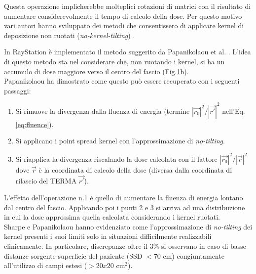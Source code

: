 {\begin{figure}
\label{fig:kern_tilt}
\end{figure}
Questa operazione implicherebbe molteplici rotazioni di matrici \cite{Sharpe1997} con il risultato di aumentare considerevolmente il tempo di calcolo della dose. 
Per questo motivo vari autori hanno sviluppato dei metodi che consentissero di applicare kernel di deposizione non ruotati (\textit{no-kernel-tilting}) \cite{Sharpe1997,Papanikolaou1993}.

In RayStation è implementato il metodo suggerito da Papanikolaou et al. \cite{Papanikolaou1993}. L'idea di questo metodo sta nel considerare che, non ruotando i kernel, si ha un accumulo di dose maggiore verso il centro del fascio (Fig.\ref{fig:kern_tilt}b).\\ 
Papanikolaou ha dimostrato come questo può essere recuperato con i seguenti passaggi:
\begin{enumerate}
\item Si rimuove la divergenza dalla fluenza di energia (termine $|\vec{r_0}|^2/|\vec{r'}|^2$ nell'Eq.\eqref{eq:fluence}).
\item Si applicano i point spread kernel con l'approssimazione di \textit{no-tilting}.
\item Si riapplica la divergenza riscalando la dose calcolata con il fattore $|\vec{r_0}|^2/|\vec{r}|^2$ dove $\vec{r}$ è la coordinata di calcolo della dose (diversa dalla coordinata di rilascio del TERMA $\vec{r'}$).
\end{enumerate}
L'effetto dell'operazione n.1 è quello di aumentare la fluenza di energia lontano dal centro del fascio. Applicando poi i punti 2 e 3 si arriva ad una distribuzione in cui la dose approssima quella calcolata considerando i kernel ruotati.\\
Sharpe e Papanikolaou \cite{Sharpe1997,Papanikolaou1993} hanno evidenziato come l'approssimazione di \textit{no-tilting} dei kernel presenti i suoi limiti solo in situazioni difficilmente realizzabili clinicamente. In particolare, discrepanze oltre il 3\% si osservano in caso di basse distanze sorgente-superficie del paziente (SSD $< 70$ cm) congiuntamente all'utilizzo di campi estesi ($> 20x20$ cm$^2$).



}
